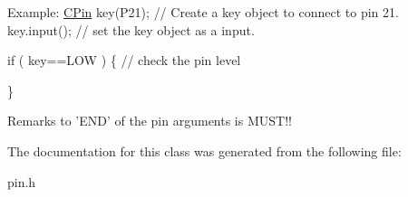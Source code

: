 \begin{DoxyCode}
Example:
        \hyperlink{class_c_pin}{CPin} key(P21);      \textcolor{comment}{// Create a key object to connect to pin 21.}
        key.input();        \textcolor{comment}{// set the key object as a input.}

        \textcolor{keywordflow}{if} ( key==LOW ) \{   \textcolor{comment}{// check the pin level}

        \}
\end{DoxyCode}


\begin{DoxyRemark}{Remarks}
to 'E\-N\-D' of the pin arguments is M\-U\-S\-T!! 
\end{DoxyRemark}


The documentation for this class was generated from the following file\-:\begin{DoxyCompactItemize}
\item 
pin.\-h\end{DoxyCompactItemize}
